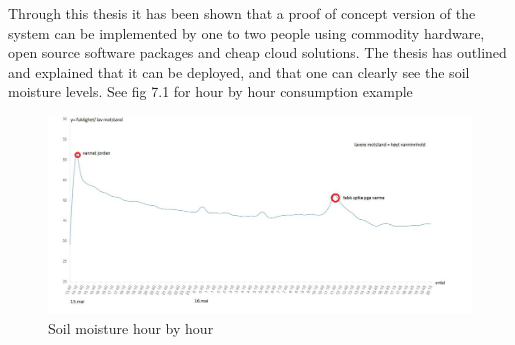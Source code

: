 \documentclass[]{uiophd}
\begin{document}
Through this thesis it has been shown that a proof of concept version of the system can be implemented by one to two people using commodity hardware, open source software packages and cheap cloud solutions. The thesis has outlined and explained that it can be deployed, and that one can clearly see the soil moisture levels. See fig 7.1 for hour by hour consumption example
 \begin{figure}[h]
\caption{Soil moisture hour by hour}
\centering
\includegraphics[width=14cm]{warter_hourbyhour.png}
\end{figure}
\end{document}
